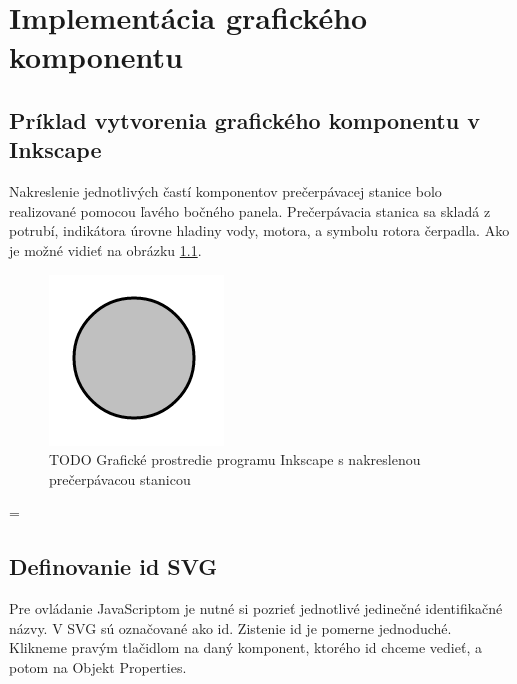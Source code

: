 \chapter{Implementácia grafického komponentu}


\section{Príklad vytvorenia grafického komponentu v Inkscape}

Nakreslenie jednotlivých častí komponentov prečerpávacej stanice bolo realizované pomocou ľavého bočného panela. Prečerpávacia stanica sa skladá z potrubí, indikátora úrovne hladiny vody, motora, a symbolu rotora čerpadla. Ako je možné vidieť na obrázku  \ref{picture1}.  


\begin{figure}[H]
	\begin{center}
		\includegraphics[width=0.7\linewidth] {obrazky/jednoduchyKruh.png}
		\caption{TODO Grafické prostredie programu Inkscape s nakreslenou prečerpávacou stanicou}
		\label{picture1}
	\end{center}
\end{figure}
=


\section{Definovanie id SVG}

Pre ovládanie JavaScriptom je nutné si pozrieť jednotlivé jedinečné identifikačné názvy. V SVG sú označované ako id. Zistenie id je pomerne jednoduché. Klikneme pravým tlačidlom na daný komponent, ktorého id chceme vedieť, a potom na Objekt Properties.

